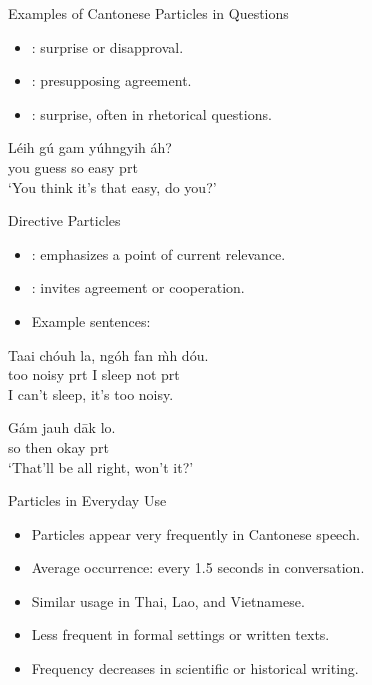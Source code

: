 \documentclass{beamer}
\newcommand{\cmn}{\mtciteform}
\begin{document}
\begin{frame}{Examples of Cantonese Particles in Questions}
  \begin{itemize}
    \item \cmn{áh}: surprise or disapproval.
    \item \cmn{há}: presupposing agreement.
    \item \cmn{mē}: surprise, often in rhetorical questions.
  \end{itemize}
  \begin{exe}
\ex 
    \gll Léih gú gam yúhngyih áh? \\
         you guess so easy prt \\
    \trans ‘You think it's that easy, do you?’
  \end{exe}
\end{frame}

\begin{frame}{Directive Particles}
  \begin{itemize}
    \item \cmn{la}: emphasizes a point of current relevance.
    \item \cmn{lo}: invites agreement or cooperation.
    \item Example sentences:
  \end{itemize}
  \begin{exe}
\ex 
    \gll Taai chóuh la, ngóh fan m̀h dóu. \\
         too noisy prt I sleep not prt \\
    \trans I can't sleep, it's too noisy.
  \end{exe}
  \begin{exe}
\ex 
    \gll Gám jauh dāk lo. \\
         so then okay prt \\
    \trans ‘That'll be all right, won't it?’
  \end{exe}
\end{frame}

\begin{frame}{Particles in Everyday Use}
  \begin{itemize}
    \item Particles appear very frequently in Cantonese speech.
    \item Average occurrence: every 1.5 seconds in conversation.
    \item Similar usage in Thai, Lao, and Vietnamese.
    \item Less frequent in formal settings or written texts.
    \item Frequency decreases in scientific or historical writing.
  \end{itemize}
\end{frame}
\end{document}

